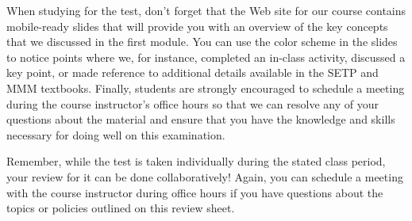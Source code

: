 \documentclass[11pt]{article}
\begin{document}
When studying for the test, don't forget that the Web site for our course
contains mobile-ready slides that will provide you with an overview of the key
concepts that we discussed in the first module. You can use the color scheme in
the slides to notice points where we, for instance, completed an in-class
activity, discussed a key point, or made reference to additional details
available in the SETP and MMM textbooks. Finally, students are strongly
encouraged to schedule a meeting during the course instructor's office hours so
that we can resolve any of your questions about the material and ensure that you
have the knowledge and skills necessary for doing well on this examination.

Remember, while the test is taken individually during the stated class period,
your review for it can be done collaboratively! Again, you can schedule a
meeting with the course instructor during office hours if you have questions
about the topics or policies outlined on this review sheet.
\end{document}
